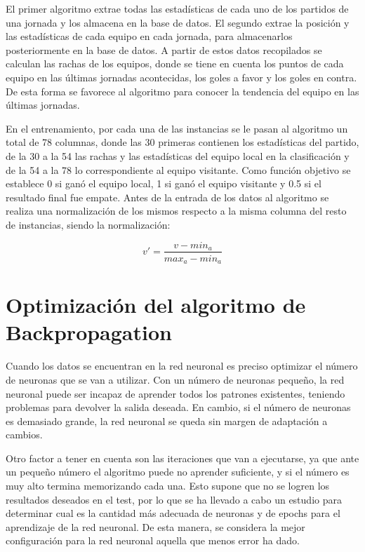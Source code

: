 El primer algoritmo extrae todas las estadísticas de cada uno de los partidos de una jornada y los almacena en la base de datos. El segundo extrae la posición y las estadísticas de cada equipo en cada jornada, para almacenarlos posteriormente en la base de datos. A partir de estos datos recopilados se calculan las rachas de los equipos, donde se tiene en cuenta los puntos de cada equipo en las últimas jornadas acontecidas, los goles a favor y  los goles en contra. De esta forma se favorece al algoritmo para conocer la tendencia del equipo en las últimas jornadas. 

En el entrenamiento, por cada una de las instancias se le pasan al algoritmo un total de 78 columnas, donde las 30 primeras contienen los estadísticas del partido, de la 30 a la 54 las rachas y las estadísticas del equipo local en la clasificación y de la 54 a la 78 lo correspondiente al equipo visitante. Como función objetivo se establece 0 si ganó el equipo local, 1 si ganó el equipo visitante y 0.5 si el resultado final fue empate.
Antes de la entrada de los datos al algoritmo se realiza una normalización de los mismos respecto a la misma columna del resto de instancias, siendo la normalización:
\begin{center}
\large{$$v' = \frac{v-min_{a}}{max_{a}-min_{a}}$$}
\end{center}


\section{Optimización del algoritmo de Backpropagation}
Cuando los datos se encuentran en la red neuronal es preciso optimizar el número de neuronas que se van a utilizar. Con un número de neuronas pequeño, la red neuronal puede ser incapaz de aprender todos los patrones existentes, teniendo problemas para devolver la salida deseada. En cambio, si el número de neuronas es demasiado grande, la red neuronal se queda sin margen de adaptación a cambios.

Otro factor a tener en cuenta son las iteraciones que van a ejecutarse, ya que ante un pequeño número el algoritmo puede no aprender suficiente, y si el número es muy alto termina memorizando cada una. Esto supone que no se logren los resultados deseados en el test, por lo que se ha llevado a cabo un estudio para determinar cual es la cantidad más adecuada de neuronas y de epochs para el aprendizaje de la red neuronal.
De esta manera, se considera la mejor  configuración para la red neuronal aquella que menos  error ha dado.

